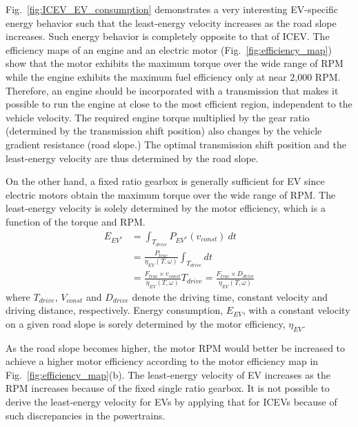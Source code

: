 \documentclass{IEEEtran}
\begin{document}
Fig.~\ref{fig:ICEV_EV_consumption} demonstrates a very interesting EV-specific energy behavior such that the least-energy velocity increases as the road slope increases. Such energy behavior is completely opposite to that of ICEV. 
%
The efficiency maps of an  engine and an electric motor (Fig.~\ref{fig:efficiency_map}) show that the motor exhibits  the maximum torque over the wide range of RPM while the engine exhibits the maximum fuel efficiency only at near 2,000 RPM. Therefore, an engine should be incorporated with a transmission that makes it possible to run the engine at close to the most efficient region, independent to the vehicle velocity. The required engine torque multiplied by the gear ratio (determined by the transmission shift position) also changes by the vehicle gradient resistance (road slope.) The optimal  transmission shift position and the least-energy velocity are thus determined by the road slope.

On the other hand, a fixed ratio gearbox is generally sufficient for EV since electric motors obtain the maximum torque over the wide range of RPM. The least-energy velocity is solely determined by the motor efficiency, which is a function of the torque and RPM. 
%
\begin{align}
E_{EV^*} 	&= \int_{T_{drive}} P_{EV^*}(v_{const})~dt \nonumber\\
		&= \frac{P_{trac}}{\eta_{EV}(T, \omega)} \int_{T_{drive}} dt  \nonumber\\
		&= \frac{F_{trac} \times v_{const}}{\eta_{EV}(T, \omega)} T_{drive}
		= \frac{F_{trac} \times D_{drive}}{\eta_{EV}(T, \omega)} \nonumber
\end{align}
where $T_{drive}$, $V_{const}$ and $D_{drive}$ denote the driving time, constant velocity and driving distance, respectively. Energy consumption, $E_{EV}$, with a constant velocity on a given road slope is sorely determined by the motor efficiency, $\eta_{EV}$. 

As the road slope becomes higher, the motor RPM would better be increased to achieve a higher motor efficiency according to the motor efficiency map in Fig.~\ref{fig:efficiency_map}(b). The least-energy velocity of EV increases as the RPM increases because of the fixed single ratio gearbox. It is not possible to derive the least-energy velocity for EVs by applying that for ICEVs because of such discrepancies in the powertrains.
\end{document}
